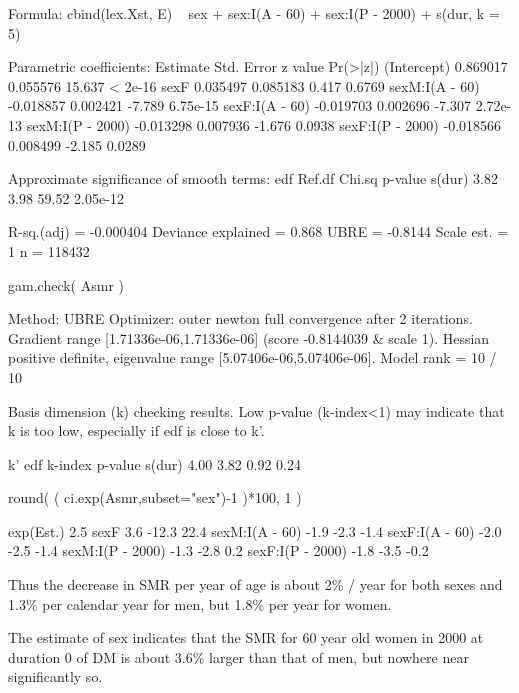 \begin{enumerate}[resume]
\begin{Schunk}
\begin{Soutput}
Formula:
cbind(lex.Xst, E) ~ sex + sex:I(A - 60) + sex:I(P - 2000) + s(dur, 
    k = 5)

Parametric coefficients:
                  Estimate Std. Error z value Pr(>|z|)
(Intercept)       0.869017   0.055576  15.637  < 2e-16
sexF              0.035497   0.085183   0.417   0.6769
sexM:I(A - 60)   -0.018857   0.002421  -7.789 6.75e-15
sexF:I(A - 60)   -0.019703   0.002696  -7.307 2.72e-13
sexM:I(P - 2000) -0.013298   0.007936  -1.676   0.0938
sexF:I(P - 2000) -0.018566   0.008499  -2.185   0.0289

Approximate significance of smooth terms:
        edf Ref.df Chi.sq  p-value
s(dur) 3.82   3.98  59.52 2.05e-12

R-sq.(adj) =  -0.000404   Deviance explained = 0.868%
UBRE = -0.8144  Scale est. = 1         n = 118432
\end{Soutput}
\begin{Sinput}
 gam.check( Asmr )
\end{Sinput}
\begin{Soutput}
Method: UBRE   Optimizer: outer newton
full convergence after 2 iterations.
Gradient range [1.71336e-06,1.71336e-06]
(score -0.8144039 & scale 1).
Hessian positive definite, eigenvalue range [5.07406e-06,5.07406e-06].
Model rank =  10 / 10 

Basis dimension (k) checking results. Low p-value (k-index<1) may
indicate that k is too low, especially if edf is close to k'.

         k'  edf k-index p-value
s(dur) 4.00 3.82    0.92    0.24
\end{Soutput}
\begin{Sinput}
 round( ( ci.exp(Asmr,subset="sex")-1 )*100, 1 )
\end{Sinput}
\begin{Soutput}
                 exp(Est.)  2.5% 97.5%
sexF                   3.6 -12.3  22.4
sexM:I(A - 60)        -1.9  -2.3  -1.4
sexF:I(A - 60)        -2.0  -2.5  -1.4
sexM:I(P - 2000)      -1.3  -2.8   0.2
sexF:I(P - 2000)      -1.8  -3.5  -0.2
\end{Soutput}
\end{Schunk}
Thus the decrease in SMR per year of age is about 2\% / year for both
sexes and 1.3\% per calendar year for men, but 1.8\% per year for
women.

The estimate of sex indicates that the SMR for 60 year old women in
2000 at duration 0 of DM is about 3.6\% larger than that of men, but nowhere near
significantly so.



\end{enumerate}
